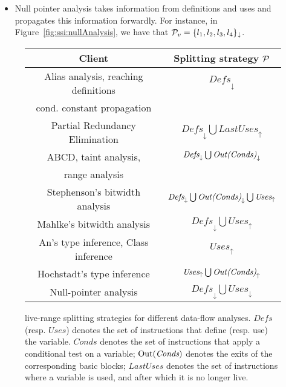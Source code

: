 {\begin{itemize}
\item Null pointer analysis takes information from definitions and uses and propagates this information forwardly.
For instance, in Figure~\ref{fig:ssi:nullAnalysis}, we have that
${\cal P}_{v} = \{l_1, l_2, l_3, l_4\}_\downarrow$.
\end{itemize}

\begin{figure}[t!]
\begin{center}
\begin{small}
\renewcommand\arraystretch{1.4}
\begin{tabular}{| c | c |} \hline
{\bf Client} & {\bf Splitting strategy ${\cal P}$} \\ \hline 
Alias analysis, reaching definitions & $\textit{Defs}_\downarrow$ \\ 
cond. constant propagation &  \\ \hline  
Partial Redundancy Elimination & $\textit{Defs}_\downarrow \bigcup \textit{LastUses}_\uparrow$ \\ \hline 
ABCD, taint analysis,  & $\textit{Defs}_\downarrow \bigcup \textit{\textrm{Out}(Conds)}_\downarrow$ \\ 
range analysis & \\ \hline 
Stephenson's bitwidth analysis & $\textit{Defs}_\downarrow \bigcup \textit{\textrm{Out}(Conds)}_\downarrow \bigcup \textit{Uses}_\uparrow$  \\ \hline 
Mahlke's bitwidth analysis & $\textit{Defs}_\downarrow \bigcup \textit{Uses}_\uparrow$  \\ \hline 
An's type inference, Class inference & $\textit{Uses}_\uparrow$ \\ \hline 
Hochstadt's type inference & $\textit{Uses}_\uparrow \bigcup \textit{\textrm{Out}(Conds)}_\uparrow$ \\ \hline 
Null-pointer analysis & $\textit{Defs}_\downarrow \bigcup\textit{Uses}_\downarrow$ \\ \hline
\end{tabular} \end{small} 
\caption{live-range splitting strategies for different data-flow analyses.
$\textit{Defs}$ (resp. $\textit{Uses}$) denotes the set of instructions that define (resp. use) the variable. $\textit{Conds}$ denotes the set of instructions that apply a conditional test on a variable; $\textrm{Out}(\textit{Conds})$ denotes the exits of the corresponding basic blocks; $\textit{LastUses}$ denotes the set of instructions where a variable is used, and after which it is no longer live.}
\label{fig:splittingSt} \end{center} \end{figure}

}
